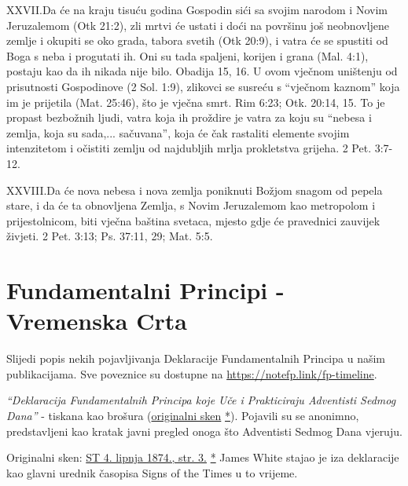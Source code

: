 \lettrine{XXVII.} Da će na kraju tisuću godina Gospodin sići sa svojim narodom i Novim Jeruzalemom (Otk 21:2), zli mrtvi će ustati i doći na površinu još neobnovljene zemlje i okupiti se oko grada, tabora svetih (Otk 20:9), i vatra će se spustiti od Boga s neba i progutati ih. Oni su tada spaljeni, korijen i grana (Mal. 4:1), postaju kao da ih nikada nije bilo. Obadija 15, 16. U ovom vječnom uništenju od prisutnosti Gospodinove (2 Sol. 1:9), zlikovci se susreću s “vječnom kaznom” koja im je prijetila (Mat. 25:46), što je vječna smrt. Rim 6:23; Otk. 20:14, 15. To je propast bezbožnih ljudi, vatra koja ih proždire je vatra za koju su “nebesa i zemlja, koja su sada,... sačuvana”, koja će čak rastaliti elemente svojim intenzitetom i očistiti zemlju od najdubljih mrlja prokletstva grijeha. 2 Pet. 3:7-12.

\lettrine{XXVIII.} Da će nova nebesa i nova zemlja poniknuti Božjom snagom od pepela stare, i da će ta obnovljena Zemlja, s Novim Jeruzalemom kao metropolom i prijestolnicom, biti vječna baština svetaca, mjesto gdje će pravednici zauvijek živjeti. 2 Pet. 3:13; Ps. 37:11, 29; Mat. 5:5.

\section*{Fundamentalni Principi - Vremenska Crta} \label{appendix:timeline}

Slijedi popis nekih pojavljivanja Deklaracije Fundamentalnih Principa u našim publikacijama. Sve poveznice su dostupne na \href{https://notefp.link/fp-timeline}{https://notefp.link/fp-timeline}.


\textit{“Deklaracija Fundamentalnih Principa koje Uče i Prakticiraju Adventisti Sedmog Dana”} - tiskana kao brošura (\href{https://adventistdigitallibrary.org/islandora/object/adl:366607?link_only=true}{originalni sken} \href{https://forgotten-pillar.s3.us-east-2.amazonaws.com/A+declaration+of+the+fundamental+principles+taught+and+practiced+by+the+Seventh-day+Adventists++.pdf}{*}). Pojavili su se anonimno, predstavljeni kao kratak javni pregled onoga što Adventisti Sedmog Dana vjeruju.


Originalni sken: \href{https://adventistdigitallibrary.org/adl-364148/signs-times-june-4-1874}{ST 4. lipnja 1874., str. 3.} \href{https://forgotten-pillar.s3.us-east-2.amazonaws.com/Signs+of+the+Times+_+June+4%2C+1874++.pdf}{*} James White stajao je iza deklaracije kao glavni urednik časopisa Signs of the Times u to vrijeme.

